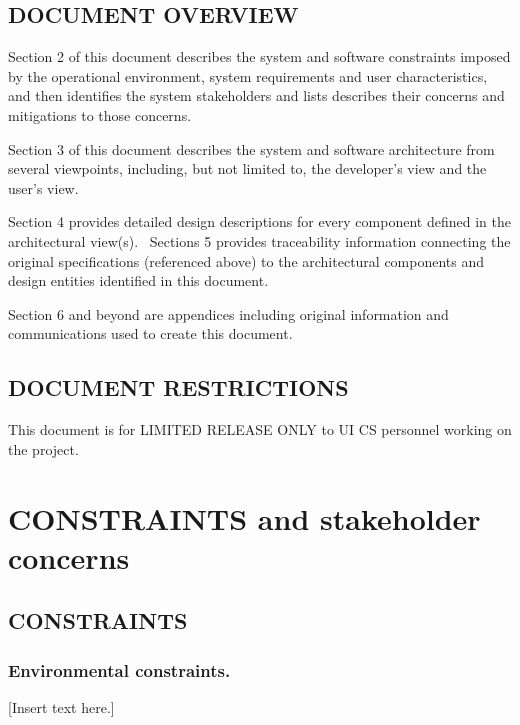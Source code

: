 \documentclass[twoside,letterpaper]{article}
\begin{document}
\subsection{DOCUMENT OVERVIEW}

{\color{black}
Section 2 of this document describes the system and software constraints
imposed by the operational environment, system requirements and user
characteristics, and then identifies the system stakeholders and lists
describes their concerns and mitigations to those concerns.}

{\color{black}
Section 3 of this document describes the system and software
architecture from several viewpoints, including, but not limited to,
the developer{\textquoteright}s view and the user{\textquoteright}s
view.}

{\color{black}
Section 4 provides detailed design descriptions for every component
defined in the architectural view(s). \ Sections 5 provides
traceability information connecting the original specifications
(referenced above) to the architectural components and design entities
identified in this document.}

{\color{black}
Section 6 and beyond are appendices including original information and
communications used to create this document.}

\subsection[DOCUMENT
RESTRICTIONS]{\bfseries\color{black} DOCUMENT
RESTRICTIONS}


{\color{black}
This document is for LIMITED RELEASE ONLY to UI CS personnel working on
the project.}

\section{CONSTRAINTS and stakeholder concerns}

\subsection{CONSTRAINTS}

\subsubsection{Environmental constraints.}
{\color{black}
[Insert text here.] }
\end{document}
